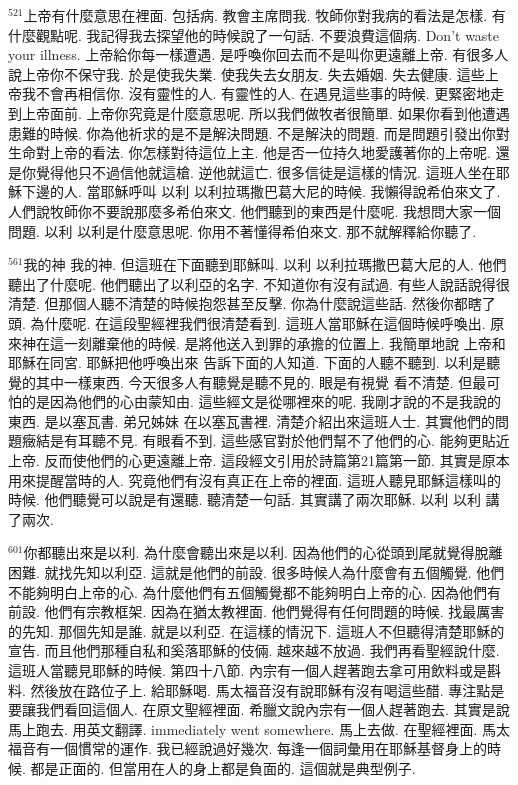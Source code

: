 \documentclass{book}
\begin{document}
$^{521}$上帝有什麼意思在裡面.
包括病.
教會主席問我.
牧師你對我病的看法是怎樣.
有什麼觀點呢.
我記得我去探望他的時候說了一句話.
不要浪費這個病.
Don't waste your illness.
上帝給你每一樣遭遇.
是呼喚你回去而不是叫你更遠離上帝.
有很多人說上帝你不保守我.
於是使我失業.
使我失去女朋友.
失去婚姻.
失去健康.
這些上帝我不會再相信你.
沒有靈性的人.
有靈性的人.
在遇見這些事的時候.
更緊密地走到上帝面前.
上帝你究竟是什麼意思呢.
所以我們做牧者很簡單.
如果你看到他遭遇患難的時候.
你為他祈求的是不是解決問題.
不是解決的問題.
而是問題引發出你對生命對上帝的看法.
你怎樣對待這位上主.
他是否一位持久地愛護著你的上帝呢.
還是你覺得他只不過信他就這槍.
逆他就這亡.
很多信徒是這樣的情況.
這班人坐在耶穌下邊的人.
當耶穌呼叫 以利 以利拉瑪撒巴葛大尼的時候.
我懶得說希伯來文了.
人們說牧師你不要說那麼多希伯來文.
他們聽到的東西是什麼呢.
我想問大家一個問題.
以利 以利是什麼意思呢.
你用不著懂得希伯來文.
那不就解釋給你聽了.

$^{561}$我的神 我的神.
但這班在下面聽到耶穌叫.
以利 以利拉瑪撒巴葛大尼的人.
他們聽出了什麼呢.
他們聽出了以利亞的名字.
不知道你有沒有試過.
有些人說話說得很清楚.
但那個人聽不清楚的時候抱怨甚至反擊.
你為什麼說這些話.
然後你都瞎了頭.
為什麼呢.
在這段聖經裡我們很清楚看到.
這班人當耶穌在這個時候呼喚出.
原來神在這一刻離棄他的時候.
是將他送入到罪的承擔的位置上.
我簡單地說 上帝和耶穌在同宮.
耶穌把他呼喚出來 告訴下面的人知道.
下面的人聽不聽到.
以利是聽覺的其中一樣東西.
今天很多人有聽覺是聽不見的.
眼是有視覺 看不清楚.
但最可怕的是因為他們的心由蒙知由.
這些經文是從哪裡來的呢.
我剛才說的不是我說的東西.
是以塞瓦書.
弟兄姊妹 在以塞瓦書裡.
清楚介紹出來這班人士.
其實他們的問題癥結是有耳聽不見.
有眼看不到.
這些感官對於他們幫不了他們的心.
能夠更貼近上帝.
反而使他們的心更遠離上帝.
這段經文引用於詩篇第21篇第一節.
其實是原本用來提醒當時的人.
究竟他們有沒有真正在上帝的裡面.
這班人聽見耶穌這樣叫的時候.
他們聽覺可以說是有還聽.
聽清楚一句話.
其實講了兩次耶穌.
以利 以利 講了兩次.

$^{601}$你都聽出來是以利.
為什麼會聽出來是以利.
因為他們的心從頭到尾就覺得脫離困難.
就找先知以利亞.
這就是他們的前設.
很多時候人為什麼會有五個觸覺.
他們不能夠明白上帝的心.
為什麼他們有五個觸覺都不能夠明白上帝的心.
因為他們有前設.
他們有宗教框架.
因為在猶太教裡面.
他們覺得有任何問題的時候.
找最厲害的先知.
那個先知是誰.
就是以利亞.
在這樣的情況下.
這班人不但聽得清楚耶穌的宣告.
而且他們那種自私和奚落耶穌的伎倆.
越來越不放過.
我們再看聖經說什麼.
這班人當聽見耶穌的時候.
第四十八節.
內宗有一個人趕著跑去拿可用飲料或是斟料.
然後放在路位子上.
給耶穌喝.
馬太福音沒有說耶穌有沒有喝這些醋.
專注點是要讓我們看回這個人.
在原文聖經裡面.
希臘文說內宗有一個人趕著跑去.
其實是說馬上跑去.
用英文翻譯.
immediately went somewhere.
馬上去做.
在聖經裡面.
馬太福音有一個慣常的運作.
我已經說過好幾次.
每逢一個詞彙用在耶穌基督身上的時候.
都是正面的.
但當用在人的身上都是負面的.
這個就是典型例子.
\end{document}
